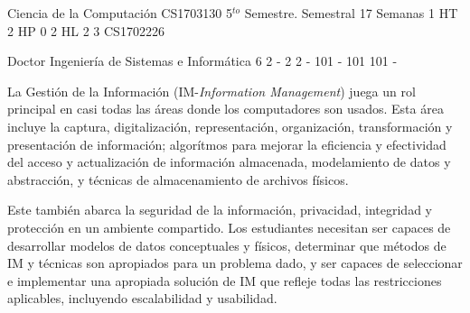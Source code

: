 \documentclass[a4paper,8pt]{article}
\begin{document}
\setNombreProfesor{}
\setGradoProfesorAbreviado{}
\sylabusHeader

\academicaTable
{Ciencia de la Computación} %
{CS1703130} %
{5$^{to}$ Semestre.} %
{Semestral} %
{17 Semanas} %
{1 HT} %
{2 HP} %
{0} %
{2 HL}  %
{2} %
{3} %
{CS1702226} %

\administrativaTable
{Doctor} %
{Ingeniería de Sistemas e Informática} %
{6} %
{2} %
{-} %
{2} %
{2} %
{-} %
{101} %
{-} %
{101} %
{101} %
{-} %


\begin{fundamentacion}
La Gestión de la Información (IM-\textit{Information Management}) juega un rol principal en casi todas las áreas donde los computadores son usados. Esta área incluye la captura, digitalización, representación, organización, transformación y presentación de información; algorítmos para mejorar la eficiencia y efectividad del acceso y actualización de información almacenada, modelamiento de datos y abstracción, y técnicas de almacenamiento de archivos físicos.

Este también abarca la seguridad de la información, privacidad, integridad y protección en un ambiente compartido. Los estudiantes necesitan ser capaces de desarrollar modelos de datos conceptuales y físicos, determinar que métodos de IM y técnicas son apropiados para un problema dado, y ser capaces de seleccionar e implementar una apropiada solución de IM que refleje todas las restricciones aplicables, incluyendo escalabilidad y usabilidad.

\end{fundamentacion}

\begin{sumilla}
\item \IMPhysicalDatabaseDesign
\item \IMTransactionProcessing
\item \IMInformationStorageandRetrieval
\item \IMDistributedDatabases

\end{sumilla}
\end{document}
